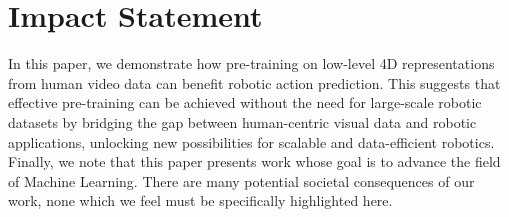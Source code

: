\section{Impact Statement} 
\label{sec:statement}

In this paper, we demonstrate how pre-training on low-level 4D representations from human video data can benefit robotic action prediction. This suggests that effective pre-training can be achieved without the need for large-scale robotic datasets by bridging the gap between human-centric visual data and robotic applications, unlocking new possibilities for scalable and data-efficient robotics. Finally, we note that this paper presents work whose goal is to advance the field of Machine Learning. There are many potential societal consequences of our work, none which we feel must be specifically highlighted here.




